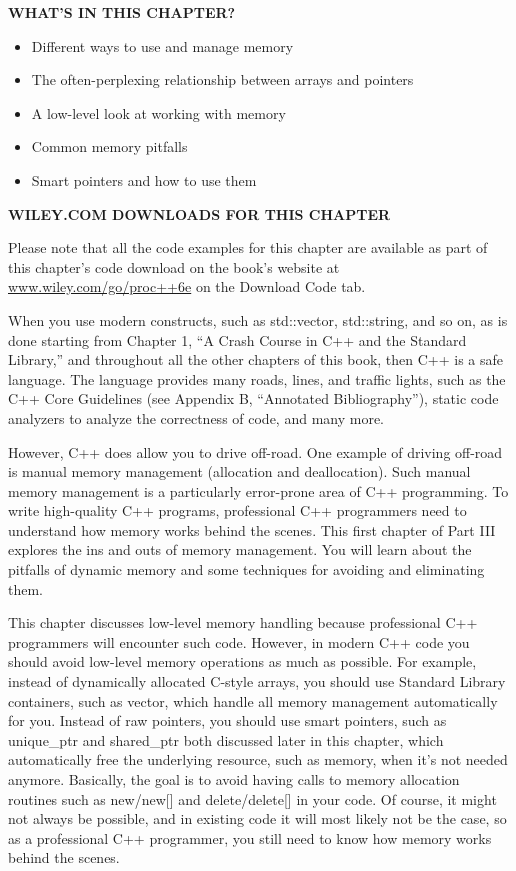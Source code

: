 \noindent
\textbf{WHAT’S IN THIS CHAPTER?}

\begin{itemize}
\item
Different ways to use and manage memory

\item
The often-perplexing relationship between arrays and pointers

\item
A low-level look at working with memory

\item
Common memory pitfalls

\item
Smart pointers and how to use them
\end{itemize}

\noindent
\textbf{WILEY.COM DOWNLOADS FOR THIS CHAPTER}

Please note that all the code examples for this chapter are available as part of this chapter’s code download on the book’s website at \url{www.wiley.com/go/proc++6e} on the Download Code tab.

When you use modern constructs, such as std::vector, std::string, and so on, as is done starting from Chapter 1, “A Crash Course in C++ and the Standard Library,” and throughout all the other chapters of this book, then C++ is a safe language. The language provides many roads, lines, and traffic lights, such as the C++ Core Guidelines (see Appendix B, “Annotated Bibliography”), static code analyzers to analyze the correctness of code, and many more.

However, C++ does allow you to drive off-road. One example of driving off-road is manual memory management (allocation and deallocation). Such manual memory management is a particularly error-prone area of C++ programming. To write high-quality C++ programs, professional C++ programmers need to understand how memory works behind the scenes. This first chapter of Part III explores the ins and outs of memory management. You will learn about the pitfalls of dynamic memory and some techniques for avoiding and eliminating them.

This chapter discusses low-level memory handling because professional C++ programmers will encounter such code. However, in modern C++ code you should avoid low-level memory operations as much as possible. For example, instead of dynamically allocated C-style arrays, you should use Standard Library containers, such as vector, which handle all memory management automatically for you. Instead of raw pointers, you should use smart pointers, such as unique\_ptr and shared\_ptr both discussed later in this chapter, which automatically free the underlying resource, such as memory, when it’s not needed anymore. Basically, the goal is to avoid having calls to memory allocation routines such as new/new[] and delete/delete[] in your code. Of course, it might not always be possible, and in existing code it will most likely not be the case, so as a professional C++ programmer, you still need to know how memory works behind the scenes.

